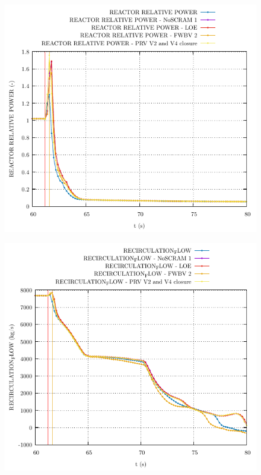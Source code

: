 \documentclass{article}
\begin{document}
\begin{multicols}{2}
\begin{figure}[H]
\centering
\includegraphics[width=\linewidth]{./graphs/REACTOR RELATIVE POWER.pdf}
\end{figure}
\begin{figure}[H]
\centering
\includegraphics[width=\linewidth]{./graphs/RECIRCULATION_FLOW.pdf}
\end{figure}
\begin{figure}[H]

\end{figure}
\end{multicols}
\end{document}
